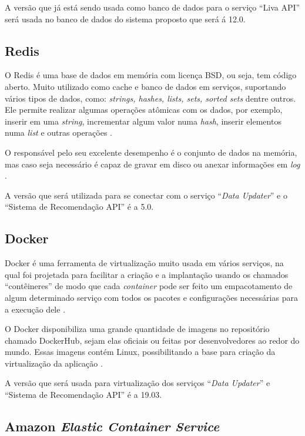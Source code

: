 A versão que já está sendo usada como banco de dados para o serviço “Liva API” será usada no banco de dados do sistema proposto que será á 12.0.

\subsection{Redis}

O Redis é uma base de dados em memória com licença BSD, ou seja, tem código aberto. Muito utilizado como cache e banco de dados em serviços, suportando vários tipos de dados, como: \textit{strings, hashes, lists, sets, sorted sets} dentre outros. Ele permite realizar algumas operações atômicas com os dados, por exemplo, inserir em uma \textit{string}, incrementar algum valor numa \textit{hash}, inserir elementos numa \textit{list} e outras operações \cite{redis:2019}.

O responsável pelo seu excelente desempenho é o conjunto de dados na memória, mas caso seja necessário é capaz de gravar em disco ou anexar informações em \textit{log} \cite{redis:2019}.

A versão que será utilizada para se conectar com o serviço “\textit{Data Updater}” e o “Sistema de Recomendação API” é a 5.0.

\subsection{Docker}

Docker é uma ferramenta de virtualização muito usada em vários serviços, na qual foi projetada para facilitar a criação e a implantação usando os chamados “contêineres” de modo que cada \textit{container} pode ser feito um empacotamento de algum determinado serviço com todos os pacotes e configurações necessárias para a execução dele \cite{OPENSOURCE.COM:2019}.

O Docker disponibiliza uma grande quantidade de imagens no repositório chamado DockerHub, sejam elas oficiais ou feitas por desenvolvedores ao redor do mundo. Essas imagens contém Linux, possibilitando a base para criação da virtualização da aplicação \cite{DOCKERHUB:2019}.

A versão que será usada para virtualização dos serviços “\textit{Data Updater}” e “Sistema de Recomendação API” é a 19.03.

\subsection{Amazon \textit{Elastic Container Service}}

